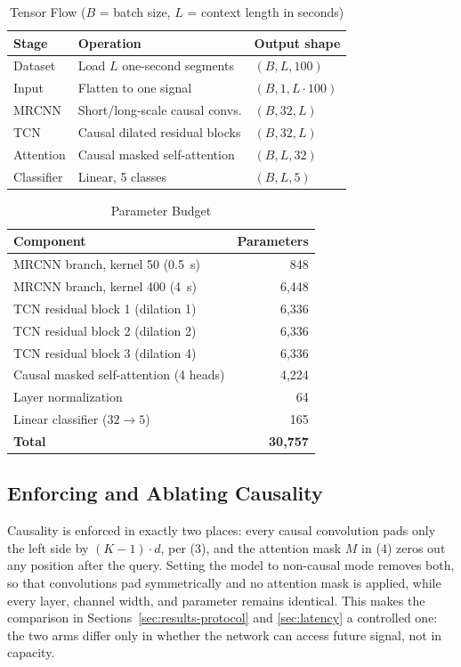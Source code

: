 \documentclass[conference]{IEEEtran}
\begin{document}
\begin{table}[t]
\caption{Tensor Flow ($B$ = batch size, $L$ = context length in seconds)}
\label{tab:tensors}
\centering
\begin{tabular}{lll}
\toprule
Stage & Operation & Output shape \\
\midrule
Dataset    & Load $L$ one-second segments   & $(B, L, 100)$ \\
Input      & Flatten to one signal          & $(B, 1, L\cdot100)$ \\
MRCNN      & Short/long-scale causal convs. & $(B, 32, L)$ \\
TCN        & Causal dilated residual blocks & $(B, 32, L)$ \\
Attention  & Causal masked self-attention   & $(B, L, 32)$ \\
Classifier & Linear, 5 classes              & $(B, L, 5)$ \\
\bottomrule
\end{tabular}
\end{table}

\begin{table}[t]
\caption{Parameter Budget}
\label{tab:params}
\centering
\begin{tabular}{lr}
\toprule
Component & Parameters \\
\midrule
MRCNN branch, kernel 50 (0.5~s)   & 848 \\
MRCNN branch, kernel 400 (4~s)    & 6{,}448 \\
TCN residual block 1 (dilation 1) & 6{,}336 \\
TCN residual block 2 (dilation 2) & 6{,}336 \\
TCN residual block 3 (dilation 4) & 6{,}336 \\
Causal masked self-attention (4 heads) & 4{,}224 \\
Layer normalization               & 64 \\
Linear classifier ($32 \to 5$)    & 165 \\
\midrule
\textbf{Total} & \textbf{30{,}757} \\
\bottomrule
\end{tabular}
\end{table}

\subsection{Enforcing and Ablating Causality}

Causality is enforced in exactly two places: every causal convolution pads only the left side by
$(K-1)\cdot d$, per (3), and the attention mask $M$ in (4) zeros out any position after the query.
Setting the model to non-causal mode removes both, so that convolutions pad symmetrically and no
attention mask is applied, while every layer, channel width, and parameter remains identical. This
makes the comparison in Sections~\ref{sec:results-protocol} and \ref{sec:latency} a controlled one:
the two arms differ only in whether the network can access future signal, not in capacity.
\end{document}
